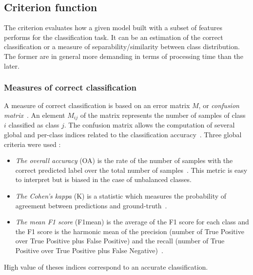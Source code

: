 \documentclass[journal,peerreview,onecolumn]{IEEEtran}
\begin{document}
    \subsection{Criterion function}
    \label{sec:criterion}
    The criterion evaluates how a given model built with a subset of features performs for the classification task. It can be an estimation of the correct classification or a measure of separability/similarity between class distribution. The former are in general more demanding in terms of processing time than the later.


        \subsubsection{Measures of correct classification}
        \label{sec:criterion-rate}

        A measure of correct classification is based on an error matrix $M$, or \emph{confusion matrix}~\cite[Chapter 4]{congalton2008assessing}. An element $M_{ij}$ of the matrix represents the number of samples of class $i$ classified as class $j$. The confusion matrix allows the computation of several global and per-class indices related to the classification accuracy~\cite{congalton2008assessing}. Three global criteria were used :

        \begin{itemize}
        \item  \emph{The overall  accuracy} (OA)  is the  rate of  the
          number of samples with the  correct predicted label over the
          total  number of  samples~\cite{congalton2008assessing}. This
          metric is  easy to interpret  but is  biased in the  case of
          unbalanced classes.

        \item \emph{The Cohen's kappa} (K) is a statistic which measures the probability of agreement between predictions and ground-truth~\cite{congalton2008assessing}.

        \item \emph{The mean F1 score}  (F1mean) is the average of the
          F1 score  for each class  and the  F1 score is  the harmonic
          mean of  the precision  (number of  True Positive  over True
          Positive plus False Positive) and the recall (number of True
          Positive over True Positive plus False Negative)~\cite{powers2011evaluation}.
        \end{itemize}
        High  value  of  theses  indices  correspond  to  an  accurate
        classification.
\end{document}
